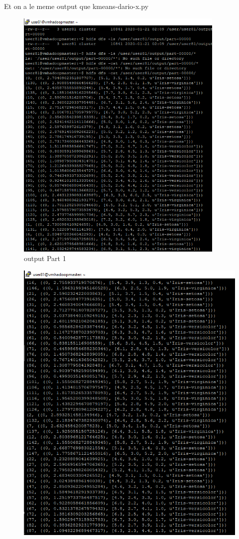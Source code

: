 \documentclass[12pt]{article}
\numberwithin{equation}{section}
\theoremstyle{plain}
\begin{document}
Et on a le meme output que kmeans-dario-x.py
\begin{figure}[H]
\centering
\includegraphics[width=10cm]{out1}
\caption{output Part 1
}
\end{figure}\begin{figure}[H]
\centering
\includegraphics{out2}

\end{figure}
\end{document}
